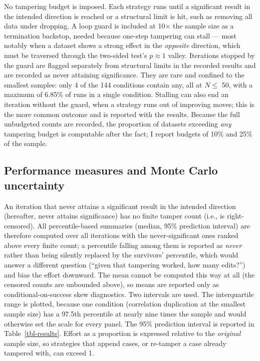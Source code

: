 \documentclass[
  nonatbib,
  authoryear,
  preprint]{elsarticle}
\begin{document}
No tampering budget is imposed. Each strategy runs until a significant
result in the intended direction is reached or a structural limit is
hit, such as removing all data under dropping. A loop guard is included
at 10× the sample size as a termination backstop, needed because
one-step tampering can stall --- most notably when a dataset shows a
strong effect in the \emph{opposite} direction, which must be traversed
through the two-sided test's \(p \approx 1\) valley. Iterations stopped
by the guard are flagged separately from structural limits in the
recorded results and are recorded as never attaining significance. They
are rare and confined to the smallest samples: only 4 of the 144
conditions contain any, all at \(N \leq\) 50, with a maximum of 6.85\%
of runs in a single condition. Stalling can also end an iteration
without the guard, when a strategy runs out of improving moves; this is
the more common outcome and is reported with the results. Because the
full unbudgeted counts are recorded, the proportion of datasets
exceeding \emph{any} tampering budget is computable after the fact; I
report budgets of 10\% and 25\% of the sample.

\subsection{Performance measures and Monte Carlo
uncertainty}\label{performance-measures-and-monte-carlo-uncertainty}

An iteration that never attains a significant result in the intended
direction (hereafter, never attains significance) has no finite tamper
count (i.e., is right-censored). All percentile-based summaries (median,
95\% prediction interval) are therefore computed over all iterations
with the never-significant ones ranked above every finite count; a
percentile falling among them is reported as \emph{never} rather than
being silently replaced by the survivors' percentile, which would answer
a different question (``given that tampering worked, how many edits?'')
and bias the effort downward. The mean cannot be computed this way at
all (the censored counts are unbounded above), so means are reported
only as conditional-on-success skew diagnostics. Two intervals are used.
The interquartile range is plotted, because one condition (correlation
duplication at the smallest sample size) has a 97.5th percentile at
nearly nine times the sample and would otherwise set the scale for every
panel. The 95\% prediction interval is reported in
Table~\ref{tbl-results}. Effort as a proportion is expressed relative to
the \emph{original} sample size, so strategies that append cases, or
re-tamper a case already tampered with, can exceed 1.
\end{document}
